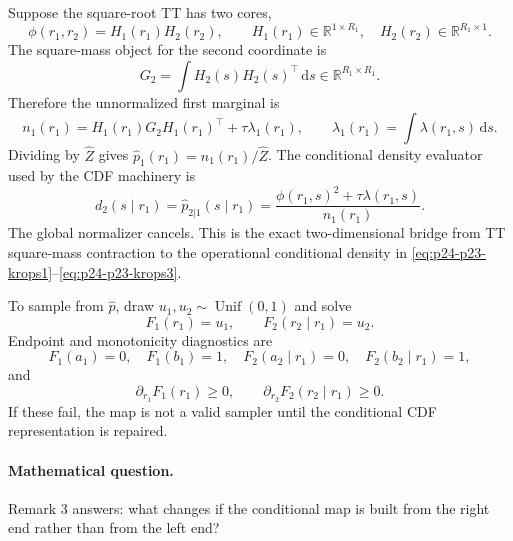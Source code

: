 \documentclass[11pt]{article}
\numberwithin{equation}{section}
\newcommand{\R}{\mathbb R}
\newcommand{\dd}{\,\mathrm d}
\begin{document}
Suppose the square-root TT has two cores,
\begin{equation}
    \phi(r_1,r_2)
    =
    H_1(r_1)H_2(r_2),
    \qquad
    H_1(r_1)\in\R^{1\times R_1},\quad
    H_2(r_2)\in\R^{R_1\times1}.
    \label{eq:p24-p23-kr2-8b}
\end{equation}
The square-mass object for the second coordinate is
\begin{equation}
    G_2
    =
    \int H_2(s)H_2(s)^\top\dd s
    \in\R^{R_1\times R_1}.
    \label{eq:p24-p23-kr2-8c}
\end{equation}
Therefore the unnormalized first marginal is
\begin{equation}
    n_1(r_1)
    =
    H_1(r_1)G_2H_1(r_1)^\top
    +
    \tau\lambda_1(r_1),
    \qquad
    \lambda_1(r_1)=\int\lambda(r_1,s)\dd s.
    \label{eq:p24-p23-kr2-8d}
\end{equation}
Dividing by \(\widehat Z\) gives \(\widehat p_1(r_1)=n_1(r_1)/\widehat Z\).
The conditional density evaluator used by the CDF machinery is
\begin{equation}
    d_2(s\mid r_1)
    =
    \widehat p_{2|1}(s\mid r_1)
    =
    \frac{\phi(r_1,s)^2+\tau\lambda(r_1,s)}
    {n_1(r_1)}.
    \label{eq:p24-p23-kr2-8e}
\end{equation}
The global normalizer cancels.  This is the exact two-dimensional bridge from
TT square-mass contraction to the operational conditional density in
\eqref{eq:p24-p23-krops1}--\eqref{eq:p24-p23-krops3}.

To sample from \(\widehat p\), draw \(u_1,u_2\sim\operatorname{Unif}(0,1)\)
and solve
\begin{equation}
    F_1(r_1)=u_1,
    \qquad
    F_2(r_2\mid r_1)=u_2.
    \label{eq:p24-p23-kr2-9}
\end{equation}
Endpoint and monotonicity diagnostics are
\begin{equation}
    F_1(a_1)=0,\quad F_1(b_1)=1,\quad
    F_2(a_2\mid r_1)=0,\quad F_2(b_2\mid r_1)=1,
    \label{eq:p24-p23-kr2-10}
\end{equation}
and
\begin{equation}
    \partial_{r_1}F_1(r_1)\ge0,
    \qquad
    \partial_{r_2}F_2(r_2\mid r_1)\ge0.
    \label{eq:p24-p23-kr2-11}
\end{equation}
If these fail, the map is not a valid sampler until the conditional CDF
representation is repaired.

\paragraph{Mathematical question.}
Remark 3 answers: what changes if the conditional map is built from the right
end rather than from the left end?
\end{document}
